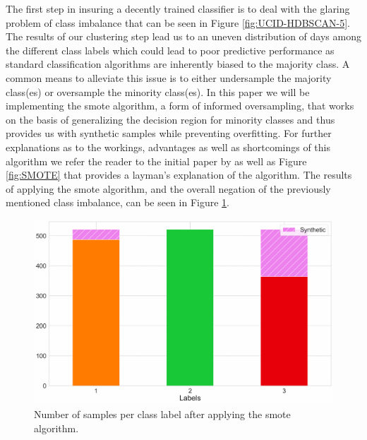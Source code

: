 \noindent \newline The first step in insuring a decently trained classifier is to deal with the glaring problem of class imbalance that can be seen in Figure \ref{fig:UCID-HDBSCAN-5}. The results of our clustering step lead us to an uneven distribution of days among the different class labels which could lead to poor predictive performance as standard classification algorithms are inherently biased to the majority class. A common means to alleviate this issue is to either undersample the majority class(es) or oversample the minority class(es). In this paper we will be implementing the \gls{smote} algorithm, a form of informed oversampling, that works on the basis of generalizing the decision region for minority classes and thus provides us with synthetic samples while preventing overfitting. For further explanations as to the workings, advantages as well as shortcomings of this algorithm we refer the reader to the initial paper by \citet{Chawla} as well as Figure \ref{fig:SMOTE} that provides a layman's explanation of the algorithm. The results of applying the \gls{smote} algorithm, and the overall negation of the previously mentioned class imbalance, can be seen in Figure \ref{fig:UCID-SMOTENC}.

\begin{figure}[H]
    \centering
    \includegraphics[width=\textwidth]{Images/Chapter 5/Stage 4/UCID/UCID-SMOTENC.pdf}
    \caption{Number of samples per class label after applying the \gls{smote} algorithm.}
    \label{fig:UCID-SMOTENC}
\end{figure}

